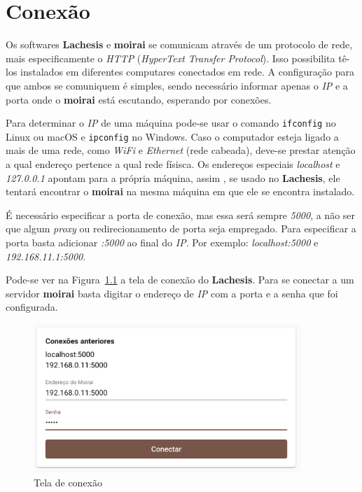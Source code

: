 
\chapter{Conexão}%
\label{chapter:connection}

Os softwares \textbf{Lachesis} e \textbf{moirai} se comunicam através de um
protocolo de rede, mais especificamente o \textit{HTTP} (\textit{HyperText
Transfer Protocol}). Isso possibilita tê-los instalados em diferentes computares
conectados em rede. A configuração para que ambos se comuniquem é simples, sendo
necessário informar apenas o \textit{IP} e a porta onde o \textbf{moirai} está
escutando, esperando por conexões.

Para determinar o \textit{IP} de uma máquina pode-se usar o comando
\texttt{ifconfig} no Linux ou macOS e \texttt{ipconfig} no
Windows. Caso o computador esteja ligado a mais de uma rede, como \textit{WiFi}
e \textit{Ethernet} (rede cabeada), deve-se prestar atenção a qual endereço
pertence a qual rede físisca. Os endereços especiais \textit{localhost} e
\textit{127.0.0.1} apontam para a própria máquina, assim , se usado no
\textbf{Lachesis}, ele tentará encontrar o \textbf{moirai} na mesma máquina em
que ele se encontra instalado.

É necessário especificar a porta de conexão, mas essa será sempre \textit{5000},
a não ser que algum \textit{proxy} ou redirecionamento de porta seja empregado.
Para especificar a porta basta adicionar \textit{:5000} ao final do \textit{IP}.
Por exemplo: \textit{localhost:5000} e \textit{192.168.11.1:5000}.

Pode-se ver na Figura~\ref{fig:connect} a tela de conexão do \textbf{Lachesis}.
Para se conectar a um servidor \textbf{moirai} basta digitar o endereço de
\textit{IP} com a porta e a senha que foi configurada.

\begin{figure}[ht!]
    \centering
    \includegraphics[width=0.9\textwidth]{imgs/connect}
    \caption[Tela de conexão]{Tela de conexão}%
    \label{fig:connect}
\end{figure}

